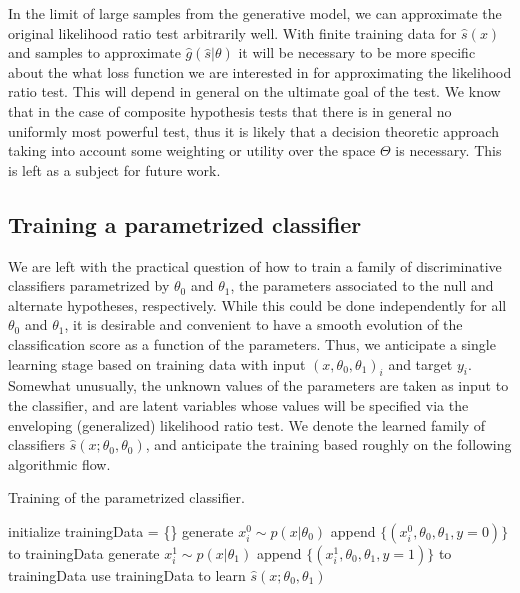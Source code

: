 \documentclass{article} %
\begin{document}

In the  limit of large samples from the generative model,  we can approximate the original likelihood ratio test arbitrarily well. With finite training data for $\hat{s}(x)$ and samples to approximate $\hat{g}(\hat{s}|\theta)$ it will be necessary to be more specific about the what loss function we are interested in for approximating the likelihood ratio test. This will depend in general on the ultimate goal of the test. We know that in the case of composite hypothesis tests that there is in general no uniformly most powerful test, thus it is likely that a decision theoretic approach taking into account some weighting or utility over the space $\Theta$ is necessary. This is left as a subject for future work.


\subsection{Training a parametrized classifier}

We are left with the practical question of how to train a family of discriminative classifiers parametrized by $\theta_0$ and $\theta_1$, the 
parameters associated to the null and alternate hypotheses, respectively. While this could be done independently
for all $\theta_0$ and $\theta_1$, it is desirable and convenient to have a smooth evolution of the classification score as a function of the parameters. Thus, we anticipate a single learning stage based on training data with input $(x, \theta_0, \theta_1)_i$ and target $y_i$. Somewhat unusually, the unknown values of the parameters are taken
as input to the classifier, and are latent variables whose values will be specified via the enveloping (generalized) likelihood ratio test. We denote the learned family of classifiers $\hat{s}(x; \theta_0, \theta_0)$, and anticipate the training based roughly on the following algorithmic flow.
\begin{algorithm}[ht]
\caption{Training of the parametrized classifier.}\label{alg:training}
\begin{algorithmic}
\STATE initialize trainingData = \{\}
		\STATE generate $x_i^0 \sim p(x|\theta_0)$
		\STATE append $\{ (x_i^0, \theta_0, \theta_1, y=0) \}$ to trainingData
		\STATE generate $x_i^1 \sim p(x|\theta_1)$
		\STATE append $\{ (x_i^1, \theta_0, \theta_1, y=1) \}$ to trainingData
	\ENDFOR
\ENDFOR
\STATE use trainingData to learn $\hat{s}(x; \theta_0, \theta_1)$
\end{algorithmic}
\end{algorithm}%
\end{document}
